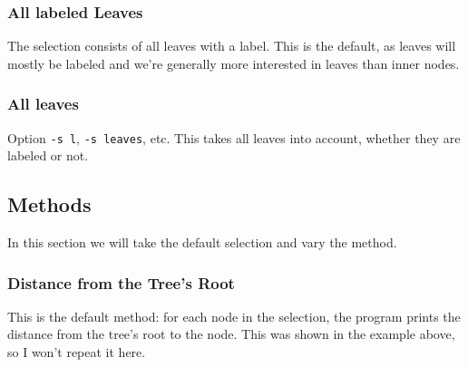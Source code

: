 \subsubsection{All labeled Leaves}

The selection consists of all leaves with a label. This is the default, as
leaves will mostly be labeled and we're generally more interested in leaves
than inner nodes.




\subsubsection{All leaves}

Option \texttt{-s l}, \texttt{-s leaves}, etc. This takes all leaves into account, whether they are labeled or not.

\subsection{Methods}

In this section we will take the default selection and vary the method.

\subsubsection{Distance from the Tree's Root}

This is the default method: for each node in the selection, the program prints
the distance from the tree's root to the node. This was shown in the example above, so I won't repeat it here.




